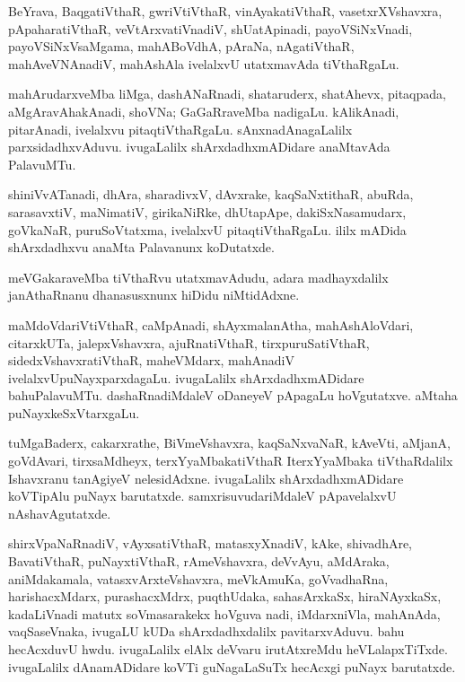 \documentclass{article}
\begin{document}
\begin{mn}%
BeYrava, BaqgatiVthaR, gwriVtiVthaR, vinAyakatiVthaR,
vasetxrXVshavxra, pApaharatiVthaR, veVtArxvatiVnadiV, shUatApinadi,
payoVSiNxVnadi, payoVSiNxVsaMgama, mahABoVdhA, pAraNa, nAgatiVthaR,
mahAveVNAnadiV, mahAshAla ivelalxvU utatxmavAda tiVthaRgaLu.
\end{mn}

\begin{mn}%
mahArudarxveMba liMga, dashANaRnadi, shataruderx, shatAhevx,
pitaqpada, aMgAravAhakAnadi, shoVNa; GaGaRraveMba
nadigaLu. kAlikAnadi, pitarAnadi, ivelalxvu
pitaqtiVthaRgaLu. sAnxnadAnagaLalilx parxsidadhxvAduvu. ivugaLalilx
shArxdadhxmADidare anaMtavAda PalavuMTu.
\end{mn}

\begin{mn}
shiniVvATanadi, dhAra, sharadivxV, dAvxrake, kaqSaNxtithaR, abuRda,
sarasavxtiV, maNimatiV, girikaNiRke, dhUtapApe, dakiSxNasamudarx,
goVkaNaR, puruSoVtatxma, ivelalxvU pitaqtiVthaRgaLu. ililx mADida
shArxdadhxvu anaMta Palavanunx koDutatxde.
\end{mn}

\begin{mn}%
meVGakaraveMba tiVthaRvu utatxmavAdudu, adara madhayxdalilx
janAthaRnanu dhanasusxnunx hiDidu niMtidAdxne.
\end{mn}

\begin{mn}
maMdoVdariVtiVthaR, caMpAnadi, shAyxmalanAtha, mahAshAloVdari,
citarxkUTa, jalepxVshavxra, ajuRnatiVthaR, tirxpuruSatiVthaR,
sidedxVshavxratiVthaR, maheVMdarx, mahAnadiV
ivelalxvUpuNayxparxdagaLu. ivugaLalilx shArxdadhxmADidare
bahuPalavuMTu. dashaRnadiMdaleV oDaneyeV pApagaLu hoVgutatxve. aMtaha puNayxkeSxVtarxgaLu.
\end{mn}

\begin{mn}
tuMgaBaderx, cakarxrathe, BiVmeVshavxra, kaqSaNxvaNaR, kAveVti,
aMjanA, goVdAvari, tirxsaMdheyx, terxYyaMbakatiVthaR IterxYyaMbaka
tiVthaRdalilx Ishavxranu tanAgiyeV nelesidAdxne. ivugaLalilx
shArxdadhxmADidare koVTipAlu puNayx barutatxde. samxrisuvudariMdaleV
pApavelalxvU nAshavAgutatxde.
\end{mn}

\begin{mn}%
shirxVpaNaRnadiV, vAyxsatiVthaR, matasxyXnadiV, kAke, shivadhAre,
BavatiVthaR, puNayxtiVthaR, rAmeVshavxra, deVvAyu, aMdAraka,
aniMdakamala, vatasxvArxteVshavxra, meVkAmuKa, goVvadhaRna,
harishacxMdarx, purashacxMdrx, puqthUdaka, sahasArxkaSx, hiraNAyxkaSx,
kadaLiVnadi matutx soVmasarakekx hoVguva nadi, iMdarxniVla, mahAnAda,
vaqSaseVnaka, ivugaLU kUDa shArxdadhxdalilx pavitarxvAduvu. bahu
hecAcxduvU hwdu. ivugaLalilx elAlx deVvaru irutAtxreMdu
heVLalapxTiTxde. ivugaLalilx dAnamADidare koVTi guNagaLaSuTx hecAcxgi
puNayx barutatxde. 
\end{mn}
\end{document}
